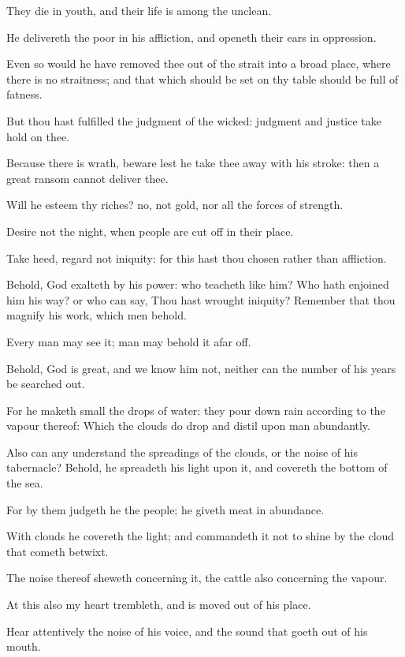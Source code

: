 \Verse They die in youth, and their life is among the unclean.

\Verse He delivereth the poor in his affliction, and openeth their ears in oppression.

\Verse Even so would he have removed thee out of the strait into a broad place, where there is no straitness; and that which should be set on thy table should be full of fatness.

\Verse But thou hast fulfilled the judgment of the wicked: judgment and justice take hold on thee.

\Verse Because there is wrath, beware lest he take thee away with his stroke: then a great ransom cannot deliver thee.

\Verse Will he esteem thy riches? no, not gold, nor all the forces of strength.

\Verse Desire not the night, when people are cut off in their place.

\Verse Take heed, regard not iniquity: for this hast thou chosen rather than affliction.

\Verse Behold, God exalteth by his power: who teacheth like him?  \Verse Who hath enjoined him his way? or who can say, Thou hast wrought iniquity?  \Verse Remember that thou magnify his work, which men behold.

\Verse Every man may see it; man may behold it afar off.

\Verse Behold, God is great, and we know him not, neither can the number of his years be searched out.

\Verse For he maketh small the drops of water: they pour down rain according to the vapour thereof: \Verse Which the clouds do drop and distil upon man abundantly.

\Verse Also can any understand the spreadings of the clouds, or the noise of his tabernacle?  \Verse Behold, he spreadeth his light upon it, and covereth the bottom of the sea.

\Verse For by them judgeth he the people; he giveth meat in abundance.

\Verse With clouds he covereth the light; and commandeth it not to shine by the cloud that cometh betwixt.

\Verse The noise thereof sheweth concerning it, the cattle also concerning the vapour.


\Chapter
\Verse At this also my heart trembleth, and is moved out of his place.

\Verse Hear attentively the noise of his voice, and the sound that goeth out of his mouth.

